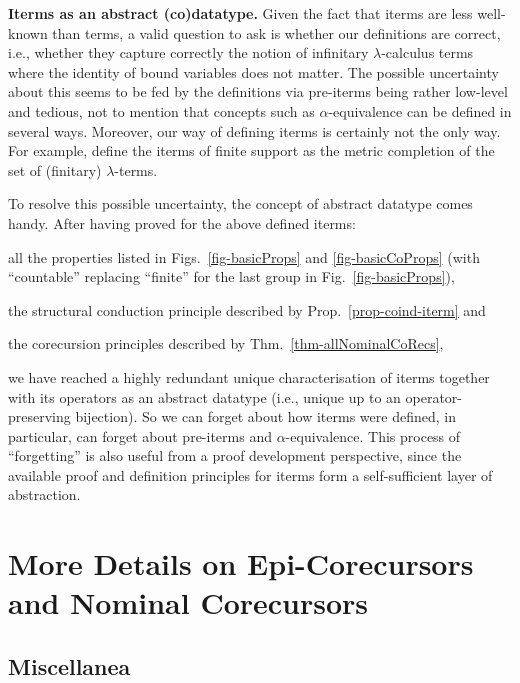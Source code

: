 \medskip
\textbf{Iterms as an abstract (co)datatype. }
Given the fact that iterms are less well-known than terms, a valid question to ask is whether our definitions are correct, i.e., whether they capture correctly the notion of infinitary $\lambda$-calculus terms where the identity of bound variables does not matter. The possible uncertainty about this seems to be fed by the definitions via pre-iterms being rather low-level and tedious, not to mention that concepts such as $\alpha$-equivalence can be defined in several %
ways. Moreover, our way of defining iterms is certainly not the only way. For example, \cite{DBLP:conf/cmcs/KurzPSV12} define the iterms of finite support as the metric completion of the set of (finitary) $\lambda$-terms. 

To resolve this possible uncertainty, the concept of abstract datatype comes handy. After having proved for the above defined iterms:
\begin{myitem}
	\item all the properties listed in Figs.~\ref{fig-basicProps} and \ref{fig-basicCoProps} (with ``countable'' replacing ``finite'' for the last group in Fig.~\ref{fig-basicProps}), 
	\item the structural conduction principle described by Prop.~\ref{prop-coind-iterm} and 
	\item the corecursion principles described by Thm.~\ref{thm-allNominalCoRecs}, 
\end{myitem}
%
we have reached a highly redundant unique characterisation of iterms together with its operators as an abstract datatype (i.e., unique up to an operator-preserving bijection). So we can forget about how iterms were defined, in particular, can forget about pre-iterms and $\alpha$-equivalence. 
This process of ``forgetting'' is also useful from a proof development perspective, since the available proof and definition principles for iterms form a self-sufficient layer of abstraction.  

\section{More Details on Epi-Corecursors and Nominal Corecursors} 
\label{app-moreDetailsCorec} 


\subsection{Miscellanea} %

